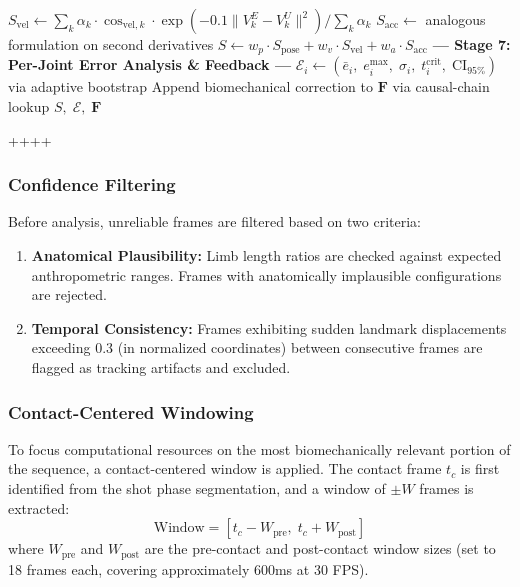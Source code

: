 \documentclass[pdflatex,sn-mathphys-num]{sn-jnl}%
\theoremstyle{thmstyleone}%
\theoremstyle{thmstyletwo}%
\theoremstyle{thmstylethree}%
\begin{document}
\begin{algorithm}[htbp]
\begin{algorithmic}[1]
\State $S_{\text{vel}} \leftarrow {\sum_k \alpha_k \cdot \cos_{\text{vel},k} \cdot \exp(-0.1\|V_k^E - V_k^U\|^2)}/{\sum_k \alpha_k}$
\State $S_{\text{acc}} \leftarrow$ analogous formulation on second derivatives
\State $S \leftarrow w_p \cdot S_{\text{pose}} + w_v \cdot S_{\text{vel}} + w_a \cdot S_{\text{acc}}$
\Statex
\State \textbf{--- Stage 7: Per-Joint Error Analysis \& Feedback ---}
    \State $\mathcal{E}_i \leftarrow (\bar{e}_i,\; e_i^{\max},\; \sigma_i,\; t_i^{\text{crit}},\; \text{CI}_{95\%})$ via adaptive bootstrap
        \State Append biomechanical correction to $\mathbf{F}$ via causal-chain lookup
    \EndIf
\EndFor
\State \Return $S,\; \mathcal{E},\; \mathbf{F}$
\end{algorithmic}
\end{algorithm}++++         

\subsubsection{Confidence Filtering}
Before analysis, unreliable frames are filtered based on two criteria:
\begin{enumerate}
    \item \textbf{Anatomical Plausibility:} Limb length ratios are checked against expected anthropometric ranges. Frames with anatomically implausible configurations are rejected.
    \item \textbf{Temporal Consistency:} Frames exhibiting sudden landmark displacements exceeding 0.3 (in normalized coordinates) between consecutive frames are flagged as tracking artifacts and excluded.
\end{enumerate}

\subsubsection{Contact-Centered Windowing}
To focus computational resources on the most biomechanically relevant portion of the sequence, a contact-centered window is applied. The contact frame $t_c$ is first identified from the shot phase segmentation, and a window of $\pm W$ frames is extracted:
\begin{equation}
\text{Window} = [t_c - W_{\text{pre}}, \; t_c + W_{\text{post}}]
\end{equation}
\noindent where $W_{\text{pre}}$ and $W_{\text{post}}$ are the pre-contact and post-contact window sizes (set to 18 frames each, covering approximately 600ms at 30 FPS).
\end{document}
